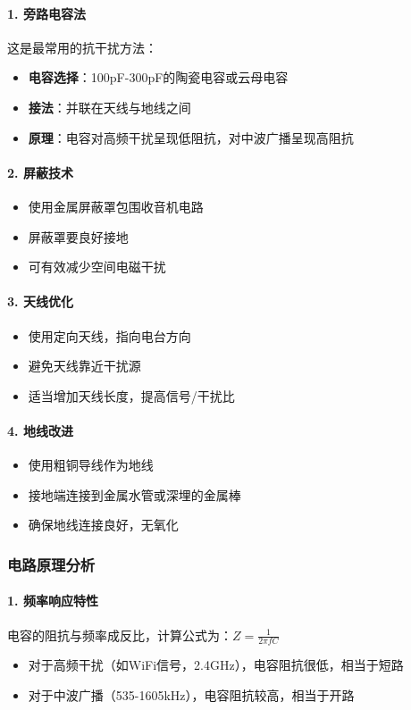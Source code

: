 \documentclass[12pt,UTF8]{ctexbook}
\begin{document}
\paragraph{1. 旁路电容法}
这是最常用的抗干扰方法：
\begin{itemize}
  \item \textbf{电容选择}：100pF-300pF的陶瓷电容或云母电容
  \item \textbf{接法}：并联在天线与地线之间
  \item \textbf{原理}：电容对高频干扰呈现低阻抗，对中波广播呈现高阻抗
\end{itemize}

\paragraph{2. 屏蔽技术}
\begin{itemize}
  \item 使用金属屏蔽罩包围收音机电路
  \item 屏蔽罩要良好接地
  \item 可有效减少空间电磁干扰
\end{itemize}

\paragraph{3. 天线优化}
\begin{itemize}
  \item 使用定向天线，指向电台方向
  \item 避免天线靠近干扰源
  \item 适当增加天线长度，提高信号/干扰比
\end{itemize}

\paragraph{4. 地线改进}
\begin{itemize}
  \item 使用粗铜导线作为地线
  \item 接地端连接到金属水管或深埋的金属棒
  \item 确保地线连接良好，无氧化
\end{itemize}

\subsubsection{电路原理分析}

\paragraph{1. 频率响应特性}
电容的阻抗与频率成反比，计算公式为：$Z = \frac{1}{2\pi fC}$
\begin{itemize}
  \item 对于高频干扰（如WiFi信号，2.4GHz），电容阻抗很低，相当于短路
  \item 对于中波广播（535-1605kHz），电容阻抗较高，相当于开路
\end{itemize}
\end{document}
